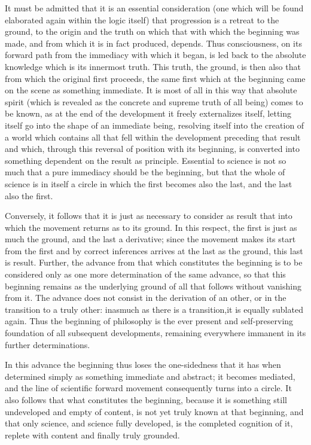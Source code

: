It must be admitted that it is an essential consideration
(one which will be found elaborated again within the logic itself)
that progression is a retreat to the ground,
to the origin and the truth on which
that with which the beginning was made,
and from which it is in fact produced, depends.
Thus consciousness, on its forward path from
the immediacy with which it began,
is led back to the absolute knowledge
which is its innermost truth.
This truth, the ground, is then also
that from which the original first proceeds,
the same first which at the beginning
came on the scene as something immediate.
It is most of all in this way that absolute spirit
(which is revealed as the concrete and supreme truth of all being)
comes to be known, as at the end of the development
it freely externalizes itself,
letting itself go into the shape of an immediate being,
resolving itself into the creation of a world
which contains all that fell within the development
preceding that result and which,
through this reversal of position with its beginning,
is converted into something dependent
on the result as principle.
Essential to science is not so much that
a pure immediacy should be the beginning,
but that the whole of science is in itself a circle
in which the first becomes also the last,
and the last also the first.

Conversely, it follows that it is
just as necessary to consider as result
that into which the movement returns as to its ground.
In this respect, the first is just as much the ground,
and the last a derivative;
since the movement makes its start from the first
and by correct inferences arrives at the last
as the ground, this last is result.
Further, the advance from that which constitutes the beginning is
to be considered only as one more determination of the same advance,
so that this beginning remains as the underlying ground of
all that follows without vanishing from it.
The advance does not consist in the derivation of an other,
or in the transition to a truly other:
inasmuch as there is a transition,it is equally sublated again.
Thus the beginning of philosophy is the ever present
and self-preserving foundation of all subsequent developments,
remaining everywhere immanent in its further determinations.

In this advance the beginning thus loses the one-sidedness
that it has when determined simply as something immediate and abstract;
it becomes mediated, and the line of scientific forward movement
consequently turns into a circle.
It also follows that what constitutes the beginning,
because it is something still undeveloped and empty of content,
is not yet truly known at that beginning,
and that only science, and science fully developed,
is the completed cognition of it,
replete with content and finally truly grounded.

